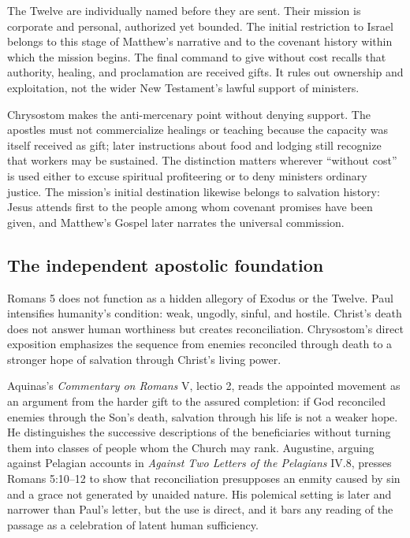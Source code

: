 The Twelve are individually named before they are sent. Their mission is corporate and personal, authorized yet bounded. The initial restriction to Israel belongs to this stage of Matthew's narrative and to the covenant history within which the mission begins. The final command to give without cost recalls that authority, healing, and proclamation are received gifts. It rules out ownership and exploitation, not the wider New Testament's lawful support of ministers.

Chrysostom makes the anti-mercenary point without denying support. The apostles must not commercialize healings or teaching because the capacity was itself received as gift; later instructions about food and lodging still recognize that workers may be sustained. The distinction matters wherever “without cost” is used either to excuse spiritual profiteering or to deny ministers ordinary justice. The mission's initial destination likewise belongs to salvation history: Jesus attends first to the people among whom covenant promises have been given, and Matthew's Gospel later narrates the universal commission.

\subsection*{The independent apostolic foundation\enspace{}}

Romans 5 does not function as a hidden allegory of Exodus or the Twelve. Paul intensifies humanity's condition: weak, ungodly, sinful, and hostile. Christ's death does not answer human worthiness but creates reconciliation. Chrysostom's direct exposition emphasizes the sequence from enemies reconciled through death to a stronger hope of salvation through Christ's living power.

Aquinas's \emph{Commentary on Romans} V, lectio 2, reads the appointed movement as an argument from the harder gift to the assured completion: if God reconciled enemies through the Son's death, salvation through his life is not a weaker hope. He distinguishes the successive descriptions of the beneficiaries without turning them into classes of people whom the Church may rank. Augustine, arguing against Pelagian accounts in \emph{Against Two Letters of the Pelagians} IV.8, presses Romans 5:10--12 to show that reconciliation presupposes an enmity caused by sin and a grace not generated by unaided nature. His polemical setting is later and narrower than Paul's letter, but the use is direct, and it bars any reading of the passage as a celebration of latent human sufficiency.

